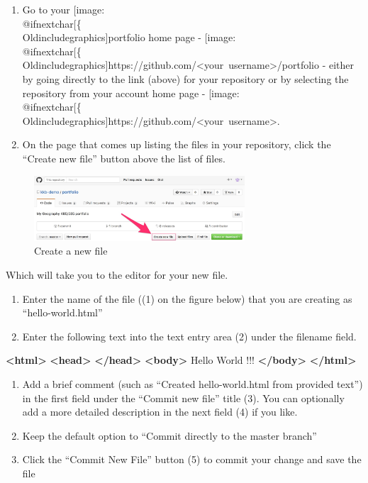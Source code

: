 \documentclass[]{book}
\makeatletter
\newenvironment{Shaded}{}{}
\newcommand{\KeywordTok}[1]{\textcolor[rgb]{0.00,0.44,0.13}{\textbf{{#1}}}}
\newcommand{\NormalTok}[1]{{#1}}
\def\ScaleIfNeeded{%
  \ifdim\Gin@nat@width>.5\linewidth
    .5\linewidth
  \else
    \Gin@nat@width
  \fi
}
\let\Oldincludegraphics\texttt{[image: \%
 \\catcode`\\@=11\\relax\%
 \%\\gdef\\includegraphics\{\\@ifnextchar[\{\\Oldincludegraphics]}{\Oldincludegraphics[width=\ScaleIfNeeded]}}%
\gdef\texttt{[image: \\@ifnextchar[\{\\Oldincludegraphics]}{\Oldincludegraphics[max size={.75\textwidth}{.75\textheight}]}}%
\makeatother
\begin{document}
\begin{enumerate}
\def\labelenumi{\arabic{enumi}.}
\item
  Go to your \texttt{portfolio} home page -
  \texttt{https://github.com/\textless{}your\ username\textgreater{}/portfolio}
  - either by going directly to the link (above) for your repository or
  by selecting the repository from your account home page -
  \texttt{https://github.com/\textless{}your\ username\textgreater{}}.
\item
  On the page that comes up listing the files in your repository, click
  the ``Create new file'' button above the list of files.
\end{enumerate}

\begin{figure}[htbp]
\centering
\includegraphics[width=0.70000\textwidth]{images/github_createButton.jpg}
\caption{Create a new file}
\end{figure}

Which will take you to the editor for your new file.

\begin{enumerate}
\def\labelenumi{\arabic{enumi}.}
\setcounter{enumi}{2}
\item
  Enter the name of the file ((1) on the figure below) that you are
  creating as ``hello-world.html''
\item
  Enter the following text into the text entry area (2) under the
  filename field.
\end{enumerate}

\begin{Shaded}
\begin{Highlighting}[numbers=left,,]
\KeywordTok{<html>}
    \KeywordTok{<head>}
    \KeywordTok{</head>}     
    \KeywordTok{<body>}
        \NormalTok{Hello World !!!}
    \KeywordTok{</body>} 
\KeywordTok{</html>}
\end{Highlighting}
\end{Shaded}

\begin{enumerate}
\def\labelenumi{\arabic{enumi}.}
\setcounter{enumi}{4}
\item
  Add a brief comment (such as ``Created hello-world.html from provided
  text'') in the first field under the ``Commit new file'' title (3).
  You can optionally add a more detailed description in the next field
  (4) if you like.
\item
  Keep the default option to ``Commit directly to the master branch''
\item
  Click the ``Commit New File'' button (5) to commit your change and
  save the file
\end{enumerate}
\end{document}
